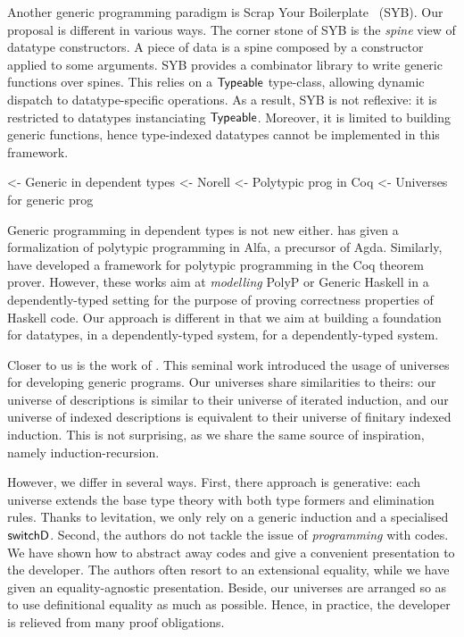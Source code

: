 Another generic programming paradigm is Scrap Your
Boilerplate~\cite{spj:syb} (SYB). Our proposal is different in various
ways. The corner stone of SYB is the \emph{spine} view of datatype
constructors. A piece of data is a spine composed by a constructor
applied to some arguments. SYB provides a combinator library to write
generic functions over spines. This relies on a $\textsf{Typeable}$
type-class, allowing dynamic dispatch to datatype-specific
operations. As a result, SYB is not reflexive: it is restricted to
datatypes instanciating $\textsf{Typeable}$. Moreover, it is limited to
building generic functions, hence type-indexed datatypes cannot be
implemented in this framework.


\begin{wstructure}
    <- Generic in dependent types
        <- Norell \cite{norell:msc-thesis}
        <- Polytypic prog in Coq \cite{verbruggen:polytype-coq}
        <- Universes for generic prog \cite{benke:universe-generic-prog}
\end{wstructure}

Generic programming in dependent types is not new
either. \citet{norell:msc-thesis} has given a formalization of
polytypic programming in Alfa, a precursor of Agda. Similarly,
\citet{verbruggen:polytype-prog-coq, verbruggen:polytype-coq} have
developed a framework for polytypic programming in the Coq theorem
prover. However, these works aim at \emph{modelling} PolyP or Generic
Haskell in a dependently-typed setting for the purpose of proving
correctness properties of Haskell code. Our approach is different in
that we aim at building a foundation for datatypes, in a
dependently-typed system, for a dependently-typed system.

Closer to us is the work of \citet{benke:universe-generic-prog}. This
seminal work introduced the usage of universes for developing generic
programs. Our universes share similarities to theirs: our universe of
descriptions is similar to their universe of iterated induction, and
our universe of indexed descriptions is equivalent to their universe
of finitary indexed induction. This is not surprising, as we share the
same source of inspiration, namely induction-recursion.

However, we differ in several ways. First, there approach is
generative: each universe extends the base type theory with both type
formers and elimination rules. Thanks to levitation, we only rely on a
generic induction and a specialised $\SYMBswitchD$. Second,
the authors do not tackle the issue of \emph{programming} with
codes. We have shown how to abstract away codes and give a convenient
presentation to the developer. The authors often resort to an
extensional equality, while we have given an equality-agnostic
presentation. Beside, our universes are arranged so as to use
definitional equality as much as possible. Hence, in practice, the
developer is relieved from many proof obligations.
